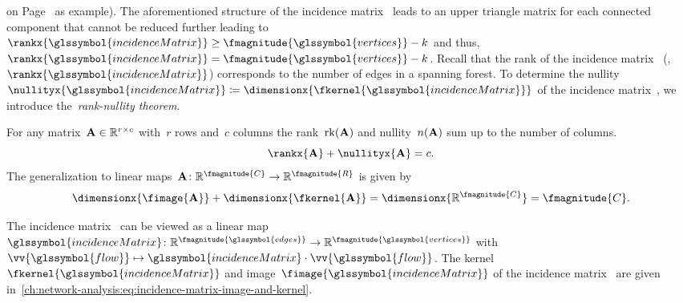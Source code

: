 on Page~\pageref{ch:network-analyzes:sec:mathematical-model:fig:TUM-proof} as 
example). The aforementioned structure of the incidence
matrix~ leads to an upper triangle matrix for each
connected component that cannot be reduced further leading to~$
    \rankx{\glssymbol{incidenceMatrix}} 
    \geq 
    \fmagnitude{ \glssymbol{vertices} } 
    - k
$ and thus, $
    \rankx{\glssymbol{incidenceMatrix}} 
    = 
    \fmagnitude{ \glssymbol{vertices} } 
    - k
$.
% 
Recall that the rank of the incidence matrix~ (\ie,
$\rankx{\glssymbol{incidenceMatrix}}$) corresponds to the number of edges in a
spanning forest. To determine the nullity~$
    \nullityx{\glssymbol{incidenceMatrix}} 
    \coloneqq 
    \dimensionx{\fkernel{\glssymbol{incidenceMatrix}}}
$ of the incidence matrix~, we introduce
the~\emph{rank-nullity theorem}.
% 
\begin{theorem}
    For any matrix~$\mathbf{A}\in\mathbb{R}^{r\times c}$ with~$r$ rows
    and~$c$ columns the rank~$\mathrm{rk}(\mathbf{A})$ and
    nullity~$n(\mathbf{A})$ sum up to the number of columns.
    $$
        \rankx{\constraintmatrix} 
        + 
        \nullityx{\constraintmatrix} 
        = 
        c.
    $$
    The generalization to linear maps~$
        \constraintmatrix
        \colon 
        \reals^{ \fmagnitude{C} } 
        \to
        \reals^{ \fmagnitude{R} }
    $ is given by
    $$
        \dimensionx{\fimage{\constraintmatrix}} 
        + 
        \dimensionx{\fkernel{\constraintmatrix}} 
        =
        \dimensionx{ \reals^{ \fmagnitude{C} } }
        =
        \fmagnitude{C}.
    $$
    \label{ch:network-analysis:def:rank-nullity-theorem}
\end{theorem}
%
The incidence matrix~ can be viewed as a linear map~$
    \glssymbol{incidenceMatrix}
    \colon
    \reals^{
        \fmagnitude{
            \glssymbol{edges}
        }
    }
    \to
    \reals^{
        \fmagnitude{
            \glssymbol{vertices}
        }
    }
$ with $
    \vv{\glssymbol{flow}}
    \mapsto
    \glssymbol{incidenceMatrix}
    \cdot
    \vv{\glssymbol{flow}}
$. The kernel~$\fkernel{\glssymbol{incidenceMatrix}}$ and
image~$\fimage{\glssymbol{incidenceMatrix}}$ of the incidence
matrix~ are given
in~\cref{ch:network-analysis:eq:incidence-matrix-image-and-kernel}.
